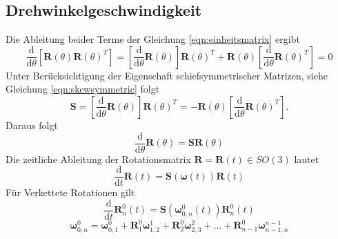 \subsection{Drehwinkelgeschwindigkeit}
Die Ableitung beider Terme der Gleichung \ref{eqn:einheitsmatrix} ergibt
\begin{equation} 
	\frac{\text{d}}{\text{d}\theta}\left[\bm{R}(\theta)\bm{R}(\theta)^T\right] = 	\left[\frac{\text{d}}{\text{d}\theta} {\bm{R}}(\theta)\right]\bm{R}(\theta)^T + \bm{R}(\theta)\left[\frac{\text{d}}{\text{d}\theta} {\bm{R}}(\theta)^T\right] = 0
\end{equation} 
Unter Berücksichtigung der Eigenschaft schiefsymmetrischer Matrizen, siehe Gleichung \ref{eqn:skewsymmetric} folgt
\begin{equation}
	\label{eqn:skewsymm}
	\bm{S} = \left[\frac{\text{d}}{\text{d}\theta}{\bm{R}}(\theta)\right]\bm{R}(\theta)^T  = -\bm{R}(\theta)     \left[\frac{\text{d}}{\text{d}\theta}{\bm{R}}(\theta)^T\right].
\end{equation} 
%
Daraus folgt
%
\begin{equation}
	\frac{\text{d}}{\text{d}\theta}\bm{R}(\theta) = \bm{SR}(\theta)
\end{equation} 
%
Die zeitliche Ableitung der Rotationsmatrix $\bm{R} = \bm{R}(t) \in SO(3)$ lautet
%
\begin{equation}
	\frac{\text{d}}{\text{d}t}\bm{R}(t) = \bm{S}\left(\bm{\omega}(t)\right)\bm{R}(t)
\end{equation} 
%
Für Verkettete Rotationen gilt
%
\begin{equation}
	\frac{\text{d}}{\text{d}t}\bm{R}^0_n(t) = \bm{S}\left(\bm{\omega}^0_{0,n}(t)\right)\bm{R}^0_n(t)
\end{equation} 
\begin{equation}
	\bm{\omega}^0_{0,n} = \bm{\omega}^0_{0,1} + \bm{R}^0_1\bm{\omega}^1_{1,2} + \bm{R}^0_2\bm{\omega}^2_{2,3} + ... + \bm{R}^0_{n-1}\bm{\omega}^{n-1}_{n-1,n}
\end{equation} 
%
%

